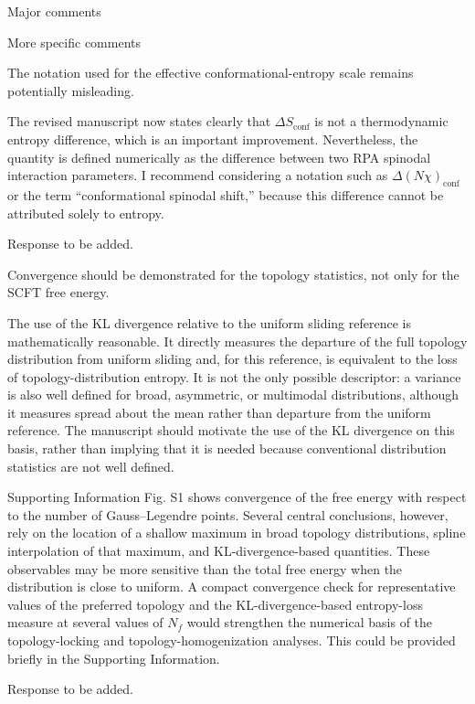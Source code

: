 \documentclass[../ResponsetoReviewers.tex]{subfiles}
\begin{document}
\begin{reviewersection}
\begin{reviewergroup}{Major comments}
\end{reviewergroup}


\begin{reviewergroup}{More specific comments}

\begin{qa}
    The notation used for the effective conformational-entropy scale remains potentially misleading.


    The revised manuscript now states clearly that $\Delta S_{\text{conf}}$ is not a thermodynamic entropy difference, which is an important improvement.
    Nevertheless, the quantity is defined numerically as the difference between two RPA spinodal interaction parameters.
    I recommend considering a notation such as $\Delta(N\chi)_{\text{conf}}$ or the term “conformational spinodal shift,” because this difference cannot be attributed solely to entropy.
\end{qa}
\begin{reply}
    Response to be added.
\end{reply}


\begin{qa}
    Convergence should be demonstrated for the topology statistics, not only for the SCFT free energy.


    The use of the KL divergence relative to the uniform sliding reference is mathematically reasonable.
    It directly measures the departure of the full topology distribution from uniform sliding and, for this reference, is equivalent to the loss of topology-distribution entropy.
    It is not the only possible descriptor: a variance is also well defined for broad, asymmetric, or multimodal distributions, although it measures spread about the mean rather than departure from the uniform reference.
    The manuscript should motivate the use of the KL divergence on this basis, rather than implying that it is needed because conventional distribution statistics are not well defined.


    Supporting Information Fig. S1 shows convergence of the free energy with respect to the number of Gauss–Legendre points.
    Several central conclusions, however, rely on the location of a shallow maximum in broad topology distributions, spline interpolation of that maximum, and KL-divergence-based quantities.
    These observables may be more sensitive than the total free energy when the distribution is close to uniform.
    A compact convergence check for representative values of the preferred topology and the KL-divergence-based entropy-loss measure at several values of $N_f$ would strengthen the numerical basis of the topology-locking and topology-homogenization analyses.
    This could be provided briefly in the Supporting Information.
\end{qa}
\begin{reply}
    Response to be added.
\end{reply}



\end{reviewergroup}
\end{reviewersection}
\end{document}
